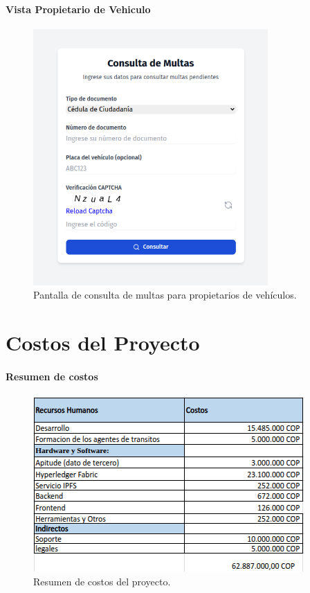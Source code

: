 \documentclass[
    letterpaper, 
    man,   
    spanish,
    12pt,
    donotrepeattitle,
    floatsintext,
    hidelinks %
]{apa7}
\begin{document}
\paragraph{Vista Propietario de Vehiculo}
\begin{figure}[htbp]
    \centering
    \includegraphics[width=0.8\textwidth]{Images/UI5.png}
    \caption{Pantalla de consulta de multas para propietarios de vehículos.}
    \label{fig:consulta_multas_propietario}
\end{figure}

\section{Costos del Proyecto}
\paragraph{Resumen de costos}

\begin{figure}[htbp]
    \centering
    \includegraphics[width=\textwidth]{Images/costos1.png}
    \caption{Resumen de costos del proyecto.}
    \label{fig:costos1}
\end{figure}
\end{document}
